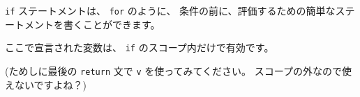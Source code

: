 \texttt{if} ステートメントは、 \texttt{for} のように、
条件の前に、評価するための簡単なステートメントを書くことができます。

ここで宣言された変数は、 \texttt{if} のスコープ内だけで有効です。

(ためしに最後の \texttt{return} 文で \texttt{v} を使ってみてください。
スコープの外なので使えないですよね？)